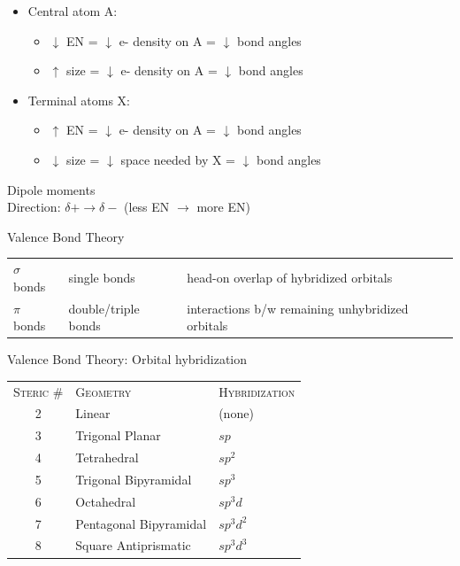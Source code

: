 \documentclass[10pt,landscape]{article}
\newcommand{\extraline}{\vspace{1em}}
\newcommand{\tableindent}{\hspace{1.5em}}
\begin{document}
\begin{multicols}{3}
\begin{itemize}
\item Central atom A: 
	\begin{itemize}
		\item $\downarrow$ EN  = $\downarrow$ e- density on A = $\downarrow$ bond angles
		\item $\uparrow$ size =  $\downarrow$ e- density on A = $\downarrow$ bond angles
	\end{itemize}

\item Terminal atoms X: 
	\begin{itemize}
		\item $\uparrow$ EN  = $\downarrow$ e- density on A = $\downarrow$ bond angles
		\item $\downarrow$ size = $\downarrow$ space needed by X = $\downarrow$ bond angles
	\end{itemize}
\end{itemize}

Dipole moments \\
\tableindent Direction: $\delta + \rightarrow \delta -$ (less EN $\rightarrow$ more EN) 
\extraline

Valence Bond Theory

\begin{tabular}{@{\tableindent}lp{16mm}p{42mm}@{}}
$\sigma$ bonds & single bonds & head-on overlap of hybridized orbitals \\
$\pi$ bonds & double/triple bonds & interactions b/w  remaining unhybridized orbitals \\
\end{tabular}
\extraline

Valence Bond Theory: Orbital hybridization 
%
\begin{tabular}{@{\tableindent}cll@{}}
	\textsc{Steric \#} & \textsc{Geometry} & \textsc{Hybridization} \\ 
	2 & Linear & (none) \\
	3 & Trigonal Planar 
	& $sp$ \\
	4 & Tetrahedral 
	& $sp^2$ \\
	5 & Trigonal Bipyramidal 
	& $sp^3$ \\
	6 & Octahedral 
	& $sp^3d$ \\
	7 & Pentagonal Bipyramidal & $sp^3d^2$ \\ 
	8 & Square Antiprismatic & $sp^3d^3$ \\
\end{tabular}
\extraline



\end{multicols}
\end{document}
